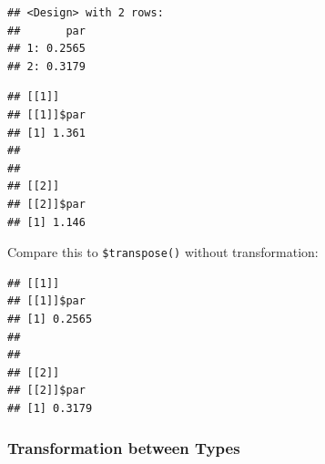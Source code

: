 \documentclass[]{scrbook}
\newenvironment{Shaded}{\begin{snugshade}}{\end{snugshade}}
\newcommand{\CommentTok}[1]{\textcolor[rgb]{0.56,0.35,0.01}{\textit{#1}}}
\newcommand{\ControlFlowTok}[1]{\textcolor[rgb]{0.13,0.29,0.53}{\textbf{#1}}}
\newcommand{\DataTypeTok}[1]{\textcolor[rgb]{0.13,0.29,0.53}{#1}}
\newcommand{\DecValTok}[1]{\textcolor[rgb]{0.00,0.00,0.81}{#1}}
\newcommand{\KeywordTok}[1]{\textcolor[rgb]{0.13,0.29,0.53}{\textbf{#1}}}
\newcommand{\NormalTok}[1]{#1}
\newcommand{\OperatorTok}[1]{\textcolor[rgb]{0.81,0.36,0.00}{\textbf{#1}}}
\newcommand{\OtherTok}[1]{\textcolor[rgb]{0.56,0.35,0.01}{#1}}
\newcommand{\StringTok}[1]{\textcolor[rgb]{0.31,0.60,0.02}{#1}}
\renewenvironment{Shaded} {\begin{snugshade}\small} {\end{snugshade}}
\begin{document}
\begin{Shaded}
\end{Shaded}

\begin{verbatim}
## <Design> with 2 rows:
##       par
## 1: 0.2565
## 2: 0.3179
\end{verbatim}

\begin{Shaded}
\end{Shaded}

\begin{verbatim}
## [[1]]
## [[1]]$par
## [1] 1.361
## 
## 
## [[2]]
## [[2]]$par
## [1] 1.146
\end{verbatim}

Compare this to \texttt{\$transpose()} without transformation:

\begin{Shaded}
\end{Shaded}

\begin{verbatim}
## [[1]]
## [[1]]$par
## [1] 0.2565
## 
## 
## [[2]]
## [[2]]$par
## [1] 0.3179
\end{verbatim}

\hypertarget{transformation-between-types}{%
\subsubsection{Transformation between Types}\label{transformation-between-types}}
\end{document}
